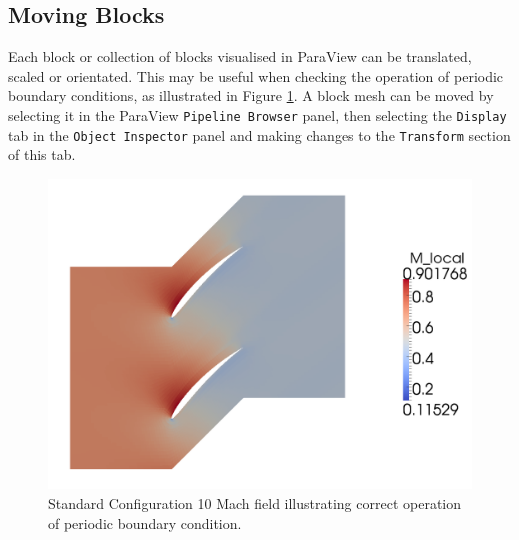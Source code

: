 \subsection{Moving Blocks}
Each block or collection of blocks visualised in ParaView can be translated, scaled 
or orientated. This may be useful when checking the operation of periodic boundary conditions, 
as illustrated in Figure \ref{fig:sc10-periodic}. A block mesh can be moved by selecting it in 
the ParaView \texttt{Pipeline Browser} panel, then selecting the \texttt{Display} tab in the \texttt{Object Inspector} 
panel and making changes to the \texttt{Transform} section of this tab.

\begin{figure}[htbp]
\begin{center}
\includegraphics[width=12cm]{../2D/turbo_sc10_parametric/periodic.png}
\end{center}
\caption{Standard Configuration 10 Mach field illustrating correct operation of periodic boundary condition.}
\label{fig:sc10-periodic}
\end{figure}
